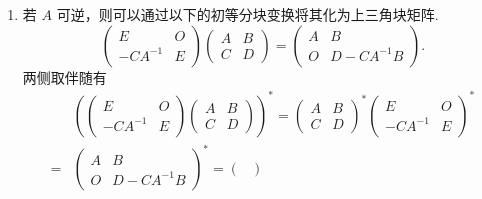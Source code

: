 \begin{enumerate}
\begin{enumerate}
              \item 若 $A$ 可逆，则可以通过以下的初等分块变换将其化为上三角块矩阵.
                    \[\begin{pmatrix}
                            E        & O \\
                            -CA^{-1} & E
                        \end{pmatrix} \begin{pmatrix}
                            A & B \\
                            C & D
                        \end{pmatrix} = \begin{pmatrix}
                            A & B          \\
                            O & D-CA^{-1}B
                        \end{pmatrix}.\]
                    两侧取伴随有
                    \begin{align*}
                            & \left(\begin{pmatrix}
                                            E        & O \\
                                            -CA^{-1} & E
                                        \end{pmatrix}
                        \begin{pmatrix}
                                A & B \\
                                C & D
                            \end{pmatrix}\right)^*
                        = \begin{pmatrix}
                              A & B \\
                              C & D
                          \end{pmatrix}^*
                        \begin{pmatrix}
                            E        & O \\
                            -CA^{-1} & E
                        \end{pmatrix}^*            \\
                        ={} & \begin{pmatrix}
                                  A & B          \\
                                  O & D-CA^{-1}B
                              \end{pmatrix}^*
                        = \begin{pmatrix}

\end{pmatrix}
\end{align*}
\end{enumerate}
\end{enumerate}
